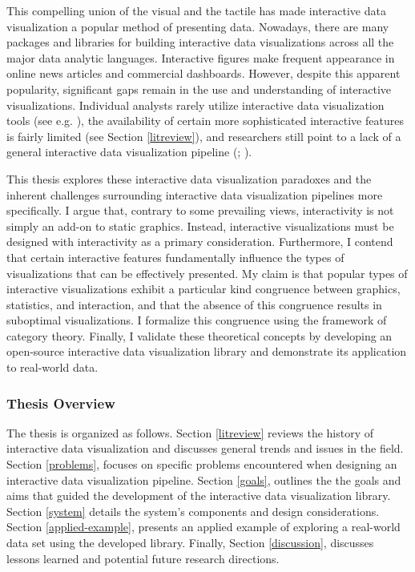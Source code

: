 \documentclass[
]{book}
\theoremstyle{definition}
\theoremstyle{definition}
\theoremstyle{definition}
\theoremstyle{definition}
\theoremstyle{remark}
\begin{document}
This compelling union of the visual and the tactile has made interactive data visualization a popular method of presenting data. Nowadays, there are many packages and libraries for building interactive data visualizations across all the major data analytic languages. Interactive figures make frequent appearance in online news articles and commercial dashboards. However, despite this apparent popularity, significant gaps remain in the use and understanding of interactive visualizations. Individual analysts rarely utilize interactive data visualization tools (see e.g. ), the availability of certain more sophisticated interactive features is fairly limited (see Section \ref{litreview}), and researchers still point to a lack of a general interactive data visualization pipeline (; ).

This thesis explores these interactive data visualization paradoxes and the inherent challenges surrounding interactive data visualization pipelines more specifically. I argue that, contrary to some prevailing views, interactivity is not simply an add-on to static graphics. Instead, interactive visualizations must be designed with interactivity as a primary consideration. Furthermore, I contend that certain interactive features fundamentally influence the types of visualizations that can be effectively presented. My claim is that popular types of interactive visualizations exhibit a particular kind congruence between graphics, statistics, and interaction, and that the absence of this congruence results in suboptimal visualizations. I formalize this congruence using the framework of category theory. Finally, I validate these theoretical concepts by developing an open-source interactive data visualization library and demonstrate its application to real-world data.

\subsubsection{Thesis Overview}\label{thesis-overview}

The thesis is organized as follows. Section \ref{litreview} reviews the history of interactive data visualization and discusses general trends and issues in the field. Section \ref{problems}, focuses on specific problems encountered when designing an interactive data visualization pipeline. Section \ref{goals}, outlines the the goals and aims that guided the development of the interactive data visualization library. Section \ref{system} details the system's components and design considerations. Section \ref{applied-example}, presents an applied example of exploring a real-world data set using the developed library. Finally, Section \ref{discussion}, discusses lessons learned and potential future research directions.
\end{document}
